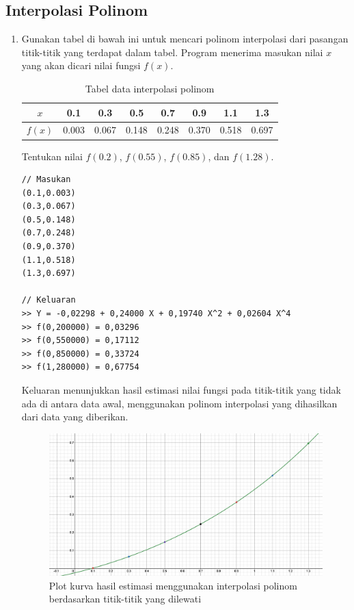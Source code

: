 \pagebreak
\subsection{Interpolasi Polinom}
\begin{enumerate}[label=(\alph*)]
    \item Gunakan tabel di bawah ini untuk mencari polinom interpolasi dari pasangan titik-titik yang terdapat dalam tabel. Program menerima masukan nilai $x$ yang akan dicari nilai fungsi $f(x)$.

    
    \begin{table}[H]
        \centering
        \caption{Tabel data interpolasi polinom}
        \begin{tabular}{c||ccccccc}
            $x$     & 0.1   & 0.3   & 0.5   & 0.7   & 0.9   & 1.1   & 1.3 \\
            \hline
            $f(x)$  & 0.003 & 0.067 & 0.148 & 0.248 & 0.370 & 0.518 & 0.697 \\
        \end{tabular}
    \end{table}

    Tentukan nilai $f(0.2)$, $f(0.55)$, $f(0.85)$, dan $f(1.28)$.

\begin{lstlisting}[caption = interpol-a.txt]
// Masukan
(0.1,0.003)
(0.3,0.067)
(0.5,0.148)
(0.7,0.248)
(0.9,0.370)
(1.1,0.518)
(1.3,0.697)

// Keluaran
>> Y = -0,02298 + 0,24000 X + 0,19740 X^2 + 0,02604 X^4
>> f(0,200000) = 0,03296
>> f(0,550000) = 0,17112
>> f(0,850000) = 0,33724
>> f(1,280000) = 0,67754\end{lstlisting}

Keluaran menunjukkan hasil estimasi nilai fungsi pada titik-titik yang tidak ada di antara data awal, menggunakan polinom interpolasi yang dihasilkan dari data yang diberikan.
\begin{figure}[H]
    \centering
    \includegraphics[width=0.75\linewidth]{image2.png}
    \caption{Plot kurva hasil estimasi menggunakan interpolasi polinom berdasarkan titik-titik yang dilewati}
\end{figure}


\end{enumerate}
